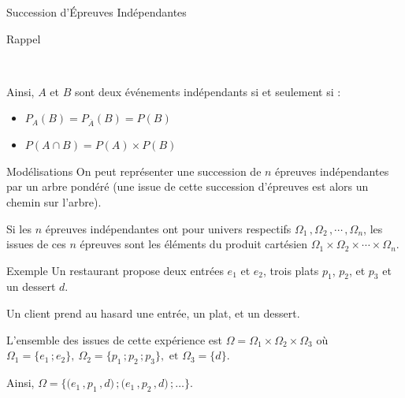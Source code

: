 \documentclass{coursbook}
\begin{document}
\begin{Gpartie}{Succession d'Épreuves Indépendantes}
\begin{Spartie}{Rappel}
\begin{center}
                \parbox{\linewidth}{} \\[2ex]
            \end{center}
            Ainsi, $A$ et $B$ sont deux événements indépendants si et seulement si :
            \begin{itemize}
                \item $P_A(B)=P_{\overline{A}}(B)=P(B)$
                \item $P(A\cap B)=P(A)\times P(B)$
            \end{itemize}
        \end{Spartie}
        \begin{Spartie}{Modélisations} 
            On peut représenter une succession de $n$ épreuves indépendantes par un arbre pondéré (une issue de cette succession d'épreuves est alors un chemin sur l'arbre).

            Si les $n$ épreuves indépendantes ont pour univers respectifs $\Omega_1\,,\Omega_2\,,\dotsb\,,\Omega_n$, les issues de ces $n$ épreuves sont les éléments du produit cartésien $\Omega_1\times\Omega_2\times\dotsb\times\Omega_n$.
        \end{Spartie}
        \pagebreak
        \begin{Spartie}{Exemple} 
            Un restaurant propose deux entrées $e_1$ et $e_2$, trois plats $p_1$, $p_2$, et $p_3$ et un dessert $d$.

            Un client prend au hasard une entrée, un plat, et un dessert.

            L'ensemble des issues de cette expérience est $\Omega=\Omega_1\times\Omega_2\times\Omega_3$ où \\ $\Omega_1=\big\{e_1\,; e_2\big\},\ \Omega_2=\big\{p_1\,; p_2\,; p_3\big\},\text{ et }\Omega_3=\big\{d\big\}$.

            Ainsi, $\Omega=\bigg\{\big(e_1\,, p_1\,, d\big)\,;\big(e_1\,, p_2\,, d\big)\,;\dotsc\bigg\}$.


\end{Spartie}
\end{Gpartie}
\end{document}
